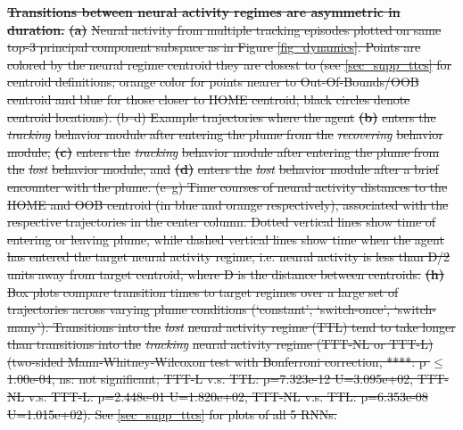\documentclass[5p,twocolumn,authoryear]{elsarticle}
\providecommand{\DIFdeltex}[1]{{\protect\color{red}\sout{#1}}}                      %
\providecommand{\DIFdelFL}[1]{\DIFdel{#1}} %
\providecommand{\DIFdel}[1]{\texorpdfstring{\DIFdeltex{#1}}{}} %
\begin{document}
{%
\textbf{\DIFdelFL{Transitions between neural activity regimes are asymmetric in duration.}}
\textbf{\DIFdelFL{(a)}} 
\DIFdelFL{Neural activity from multiple tracking episodes plotted on same top-3 principal component subspace as in Figure \ref{fig_dynamics}.
Points are colored by the neural regime centroid they are closest to (see \ref{sec_supp_ttcs} for centroid definitions; orange color for points nearer to Out-Of-Bounds/OOB centroid and blue for those closer to HOME centroid; black circles denote centroid locations). 
(b--d) 
Example trajectories where the agent 
}\textbf{\DIFdelFL{(b)}} %
\DIFdelFL{enters the }\textit{\DIFdelFL{tracking}} %
\DIFdelFL{behavior module after entering the plume from the }\textit{\DIFdelFL{recovering}} %
\DIFdelFL{behavior module,
}\textbf{\DIFdelFL{(c)}} %
\DIFdelFL{enters the }\textit{\DIFdelFL{tracking}} %
\DIFdelFL{behavior module after entering the plume from the }\textit{\DIFdelFL{lost}} %
\DIFdelFL{behavior module, and
}\textbf{\DIFdelFL{(d)}} %
\DIFdelFL{enters the }\textit{\DIFdelFL{lost}} %
\DIFdelFL{behavior module after a brief encounter with the plume.
(e--g)
Time courses of neural activity distances to the HOME and OOB centroid (in blue and orange respectively), associated with the respective trajectories in the center column.
Dotted vertical lines show time of entering or leaving plume, while dashed vertical lines show time when the agent has entered the target neural activity regime, i.e.
neural activity is less than D/2 units away from target centroid, where D is the distance between centroids.   
}\textbf{\DIFdelFL{(h)}} %
\DIFdelFL{Box plots compare transition times to target regimes over a large set of trajectories across varying plume conditions (`constant', `switch-once', `switch-many'). 
Transitions into the }\textit{\DIFdelFL{lost}} %
\DIFdelFL{neural activity regime (TTL) tend to take longer than transitions into the }\textit{\DIFdelFL{tracking}} %
\DIFdelFL{neural activity regime (TTT-NL or TTT-L)
(two-sided Mann-Whitney-Wilcoxon test with Bonferroni correction, ****: p $\leq$ 1.00e-04, ns: not significant; TTT-L v.s. TTL: p=7.323e-12 U=3.095e+02, TTT-NL v.s. TTT-L: p=2.448e-01 U=1.820e+02, TTT-NL v.s. TTL: p=6.353e-08 U=1.015e+02).
See  \ref{sec_supp_ttcs} for plots of all 5 RNNs. 
}}
\end{document}
